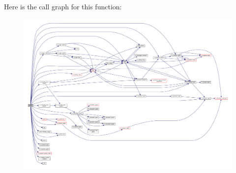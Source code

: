 Here is the call graph for this function\+:
\nopagebreak
\begin{figure}[H]
\begin{center}
\leavevmode
\includegraphics[width=350pt]{shell_8f90_a19f7365559e8816247241c4721e8eccb_cgraph}
\end{center}
\end{figure}
